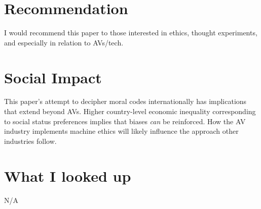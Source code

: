 \documentclass[12pt, letterpaper]{article}
\begin{document}
\section{Recommendation}
\label{sec:rec}
I would recommend this paper to those interested in ethics, thought experiments, and especially in relation to AVs/tech.

\section{Social Impact}
\label{sec:impact}
This paper's attempt to decipher moral codes internationally has implications that extend beyond AVs. Higher country-level economic inequality corresponding to social status preferences implies that biases \emph{can} be reinforced. How the AV industry implements machine ethics will likely influence the approach other industries follow.

\section{What I looked up}
\label{sec:looked up}
N/A




% 
% 




\end{document}
